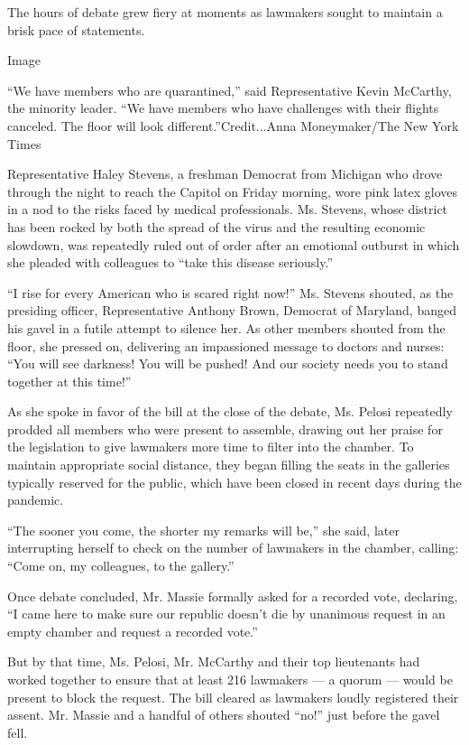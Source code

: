 The hours of debate grew fiery at moments as lawmakers sought to
maintain a brisk pace of statements.

Image

``We have members who are quarantined,'' said Representative Kevin
McCarthy, the minority leader. ``We have members who have challenges
with their flights canceled. The floor will look
different.''Credit...Anna Moneymaker/The New York Times

Representative Haley Stevens, a freshman Democrat from Michigan who
drove through the night to reach the Capitol on Friday morning, wore
pink latex gloves in a nod to the risks faced by medical professionals.
Ms. Stevens, whose district has been rocked by both the spread of the
virus and the resulting economic slowdown, was repeatedly ruled out of
order after an emotional outburst in which she pleaded with colleagues
to ``take this disease seriously.''

``I rise for every American who is scared right now!'' Ms. Stevens
shouted, as the presiding officer, Representative Anthony Brown,
Democrat of Maryland, banged his gavel in a futile attempt to silence
her. As other members shouted from the floor, she pressed on, delivering
an impassioned message to doctors and nurses: ``You will see darkness!
You will be pushed! And our society needs you to stand together at this
time!''

As she spoke in favor of the bill at the close of the debate, Ms. Pelosi
repeatedly prodded all members who were present to assemble, drawing out
her praise for the legislation to give lawmakers more time to filter
into the chamber. To maintain appropriate social distance, they began
filling the seats in the galleries typically reserved for the public,
which have been closed in recent days during the pandemic.

``The sooner you come, the shorter my remarks will be,'' she said, later
interrupting herself to check on the number of lawmakers in the chamber,
calling: ``Come on, my colleagues, to the gallery.''

Once debate concluded, Mr. Massie formally asked for a recorded vote,
declaring, ``I came here to make sure our republic doesn't die by
unanimous request in an empty chamber and request a recorded vote.''

But by that time, Ms. Pelosi, Mr. McCarthy and their top lieutenants had
worked together to ensure that at least 216 lawmakers --- a quorum ---
would be present to block the request. The bill cleared as lawmakers
loudly registered their assent. Mr. Massie and a handful of others
shouted ``no!'' just before the gavel fell.

